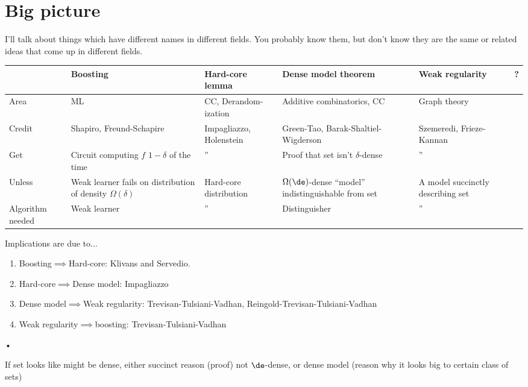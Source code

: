 \section{Big picture}

I'll talk about things which have different names in different fields. %
You probably know them, but don't know they are the same or related ideas that come up in different fields.


\begin{tabular}{|p{25mm}|p{25mm}|p{25mm}|p{25mm}|p{25mm}|p{1mm}|}
\hline 
 & Boosting & Hard-core lemma & Dense model theorem & Weak regularity & ?\tabularnewline
\hline 
Area & ML & CC,  Derandom-ization & Additive combinatorics, CC & Graph theory & \tabularnewline
\hline 
Credit & Shapiro, Freund-Schapire & Impagliazzo, Holenstein & Green-Tao, Barak-Shaltiel-Wigderson & Szemeredi, Frieze-Kannan & \tabularnewline
\hline 
Get & Circuit computing $f$ $1-\delta$ of the time & '' & Proof that set isn't $\delta$-dense & '' & \tabularnewline
\hline 
Unless & Weak learner fails on distribution of density $\Omega(\delta)$ & Hard-core distribution  & $\Omega(\de)$-dense ``model'' indistinguishable from set & A model succinctly describing set & \tabularnewline
\hline 
Algorithm needed %
 & Weak learner & '' & Distinguisher & '' & \tabularnewline
\hline 
\end{tabular}


Implications are due to...
\begin{enumerate}
\item
Boosting$\implies$Hard-core: 
Klivans and Servedio.
\item
Hard-core$\implies$Dense model:
Impagliazzo
\item Dense model$\implies$Weak regularity:
Trevisan-Tulsiani-Vadhan, Reingold-Trevisan-Tulsiani-Vadhan
\item Weak regularity$\implies$boosting: Trevisan-Tulsiani-Vadhan
\end{enumerate}•


If set looks like might be dense, either succinct reason (proof) not $\de$-dense, or dense model (reason why it looks big to certain class of sets)

